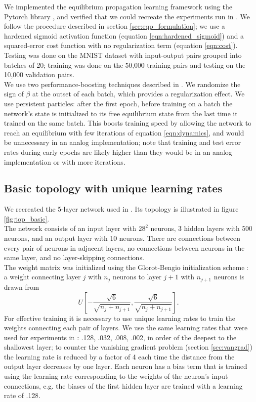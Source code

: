 \documentclass{article}
\newcommand{\npar}{\\\indent}
\begin{document}
We implemented the equilibrium propagation learning framework \cite{scellier17} using the Pytorch library \cite{pytorch}, and verified that we could recreate the experiments run in \cite{scellier17}. We follow the procedure described in section \ref{sec:eqp_formulation}; we use a hardened sigmoid activation function (equation \ref{eqn:hardened_sigmoid}) and a squared-error cost function with no regularization term (equation \ref{eqn:cost}). Testing was done on the MNIST dataset \cite{mnist1998} with input-output pairs grouped into batches of 20; training was done on the 50,000 training pairs and testing on the 10,000 validation pairs.
\npar
We use two performance-boosting techniques described in \cite{scellier17}. We randomize the sign of $\beta$ at the outset of each batch, which provides a regularization effect. We use persistent particles: after the first epoch, before training on a batch the network's state is initialized to its free equilibrium state from the last time it trained on the same batch. This boosts training speed by allowing the network to reach an equilibrium with few iterations of equation \ref{eqn:dynamics}, and would be unnecessary in an analog implementation; note that training and test error rates during early epochs are likely higher than they would be in an analog implementation or with more iterations.

\subsection{Basic topology with unique learning rates}
\label{sec:basic_topology}

We recreated the 5-layer network used in \cite{scellier17}. Its topology is illustrated in figure \ref{fig:top_basic}.
\npar
The network consists of an input layer with $28^2$ neurons, 3 hidden layers with 500 neurons, and an output layer with 10 neurons. There are connections between every pair of neurons in adjacent layers, no connections between neurons in the same layer, and no layer-skipping connections.
\npar
The weight matrix was initialized using the Glorot-Bengio initialization scheme \cite{glorot2010}: a weight connecting layer $j$ with $n_j$ neurons to layer $j+1$ with $n_{j+1}$ neurons is drawn from 
\begin{equation}
\label{eqn:gb_init}
U[-\frac{\sqrt{6}}{\sqrt{n_j+n_{j+1}}},\frac{\sqrt{6}}{\sqrt{n_j+n_{j+1}}}].
\end{equation}
For effective training it is necessary to use unique learning rates to train the weights connecting each pair of layers. We use the same learning rates that were used for experiments in \cite{scellier17}: .128, .032, .008, .002, in order of the deepest to the shallowest layer; to counter the vanishing gradient problem (section \ref{sec:vangrad}) the learning rate is reduced by a factor of 4 each time the distance from the output layer decreases by one layer. Each neuron has a bias term that is trained using the learning rate corresponding to the weights of the neuron's input connections, e.g. the biases of the first hidden layer are trained with a learning rate of .128.
\end{document}
